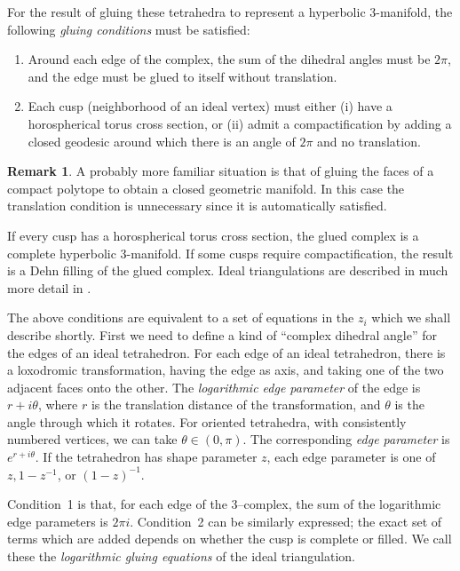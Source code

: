 \documentclass[a4paper]{amsart}
\theoremstyle{definition}
\newtheorem{remark}[theorem]{Remark}
\begin{document}
For the result of gluing these tetrahedra to represent a hyperbolic
3-manifold, the following {\em gluing conditions} must be satisfied:
\begin{enumerate}
\item Around each edge of the complex, the sum of the dihedral angles must
be $2\pi$, and the edge must be glued to itself without translation. 
\item Each cusp (neighborhood of an ideal vertex) must
either (i)  have a horospherical torus cross section, or (ii)
admit a compactification by adding a closed geodesic around which there
is an angle of $2\pi$ and no translation. 
\end{enumerate}

\begin{remark}
A probably more familiar situation is that of gluing the faces of a
compact polytope to obtain a closed geometric manifold. In this case
the translation condition is unnecessary since it is automatically
satisfied. 
\end{remark}

If every cusp has a horospherical torus cross section, the glued
complex is a complete hyperbolic 3-manifold. 
If some cusps require compactification, the result is a Dehn filling
of the glued complex. 
Ideal triangulations are described in much more detail in
\cite{thurston}. 


The above conditions are equivalent to a set of equations in the $z_i$
which we shall describe shortly. 
First we need to define a kind of ``complex dihedral
angle'' for the edges of an ideal tetrahedron.
For each edge of an ideal tetrahedron, there is a loxodromic
transformation, having the edge as axis, and 
taking one of the two adjacent faces onto the other. The {\em
logarithmic edge parameter} of the edge is $r + i\theta$, where $r$ is
the translation distance of the transformation, and $\theta$ is the
angle through which it rotates. For oriented tetrahedra, with
consistently numbered vertices, we can take $\theta \in (0,\pi)$. The
corresponding {\em edge parameter} is $e^{r+i\theta}$.  If the
tetrahedron has shape parameter $z$, each edge parameter is one of
$z, 1-z^{-1}$, or $(1-z)^{-1}$.

Condition~1 is that, for each edge of the 3--complex, the sum of the
logarithmic edge parameters is $2\pi i$.  Condition~2 can be similarly
expressed; the exact set of terms which are added depends on whether
the cusp is 
complete or filled.
We call these the {\em
logarithmic gluing equations} of the ideal triangulation.  
\end{document}
